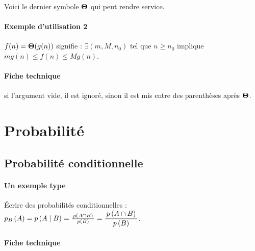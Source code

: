 \documentclass[12pt,a4paper]{article}
\theoremstyle{definition}
\begin{document}
\begin{tcblisting}{}
Voici le dernier symbole $\bigtheta{}$ qui peut rendre service.
\end{tcblisting}


\paragraph{Exemple d'utilisation 2}

\begin{tcblisting}{}
$f(n) = \bigtheta{g(n)}$ signifie : $\exists (m, M, n_0)$ tel que $n \geqslant n_0$
implique $m g(n) \leqslant f(n) \leqslant M g(n)$.
\end{tcblisting}


\paragraph{Fiche technique}


\IDarg{} si l'argument vide, il est ignoré, sinon il est mis entre des parenthèses après $\bigtheta{}$.




\section{Probabilité}

\subsection{Probabilité conditionnelle}

\paragraph{Un exemple type}

\begin{tcblisting}{}
Écrire des probabilités conditionnelles :
$\probacond{p}{A}{B} = \probacond*{p}{A}{B}
                     = \probacond**{p}{A}{B}
                     = \dprobacond**{p}{A}{B}$.
\end{tcblisting}


\paragraph{Fiche technique}


\end{document}
